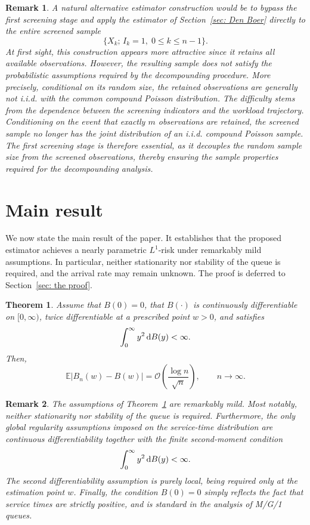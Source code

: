 \documentclass[12pt]{article}
\newtheorem{theorem}{Theorem}
\newcommand{\1}{\mathbf{1}}
\newtheorem{remark}{Remark}
\begin{document}
\begin{remark} \normalfont A natural alternative estimator construction would be to bypass the first screening stage and apply the estimator of Section~\ref{sec: Den Boer} directly to the entire screened sample \[ \{X_k;\, I_k=1,\;0\leq k\leq n-1\}. \] At first sight, this construction appears more attractive since it retains all available observations. However, the resulting sample does not satisfy the probabilistic assumptions required by the decompounding procedure. More precisely, conditional on its random size, the retained observations are generally not i.i.d. with the common compound Poisson distribution. The difficulty stems from the dependence between the screening indicators and the workload trajectory. Conditioning on the event that exactly $m$ observations are retained, the screened sample no longer has the joint distribution of an i.i.d. compound Poisson sample. The first screening stage is therefore essential, as it decouples the random sample size from the screened observations, thereby ensuring the sample properties required for the decompounding analysis.
\end{remark}


\section{Main result}\label{sec: result} We now state the main result of the paper. It establishes that the proposed estimator achieves a nearly parametric $L^1$-risk under remarkably mild assumptions. In particular, neither stationarity nor stability of the queue is required, and the arrival rate may remain unknown. The proof is deferred to Section~\ref{sec: the proof}. \begin{theorem}\label{thm: main} Assume that $B(0)=0$, that $B(\cdot)$ is continuously differentiable on $[0,\infty)$, twice differentiable at a prescribed point $w>0$, and satisfies \[ \int_0^\infty y^2\,{\rm d}B(y)<\infty. \] Then, \[ \mathbb E\!\left|B_n(w)-B(w)\right| = \mathcal O\!\left( \frac{\log n}{\sqrt n} \right), \qquad n\to\infty. \] \end{theorem} \begin{remark} \normalfont The assumptions of Theorem~\ref{thm: main} are remarkably mild. Most notably, neither stationarity nor stability of the queue is required. Furthermore, the only global regularity assumptions imposed on the service-time distribution are continuous differentiability together with the finite second-moment condition \[ \int_0^\infty y^2\,{\rm d}B(y)<\infty. \] The second differentiability assumption is purely local, being required only at the estimation point $w$. Finally, the condition $B(0)=0$ simply reflects the fact that service times are strictly positive, and is standard in the analysis of M/G/1 queues. \end{remark} 
\end{document}
